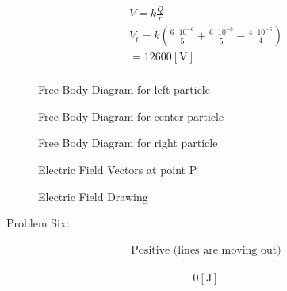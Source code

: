 \documentclass[12pt]{article}
\begin{document}
\begin{equation}
  \begin{split}
    V=k\frac{Q}{r}\\
    V_t=k\left( \frac{6\cdot10^{-6}}{5}+\frac{6\cdot10^{-6}}{5}-\frac{4\cdot10^{-6}}{4} \right)\\
    =12600[\si{\volt}]\\
  \end{split}
  \label{12}
\end{equation}


\hline

\newpage

    \begin{figure}[h]
      \centering
      
      \caption{Free Body Diagram for left particle}
      \label{fig:2}
    \end{figure}

    \begin{figure}[h]
      \centering
      
      \caption{Free Body Diagram for center particle}
      \label{fig:3}
    \end{figure}

    \begin{figure}[h]
      \centering
      
      \caption{Free Body Diagram for right particle}
      \label{fig:4}
    \end{figure}

    \begin{figure}[h]
      \centering
      
      \caption{Electric Field Vectors at point P}
      \label{fig:5}
    \end{figure}

    \begin{figure}[h]
      \centering
      
      \caption{Electric Field Drawing}
      \label{fig:6}
    \end{figure}
    
    \newpage

\begin{center}
  Problem Six:
\end{center}
\hline

\begin{equation}
  \begin{split}
    \text{Positive (lines are moving out)}
  \end{split}
  \label{13}
\end{equation}

\begin{equation}
  \begin{split}
    0[\si{\joule}]\\
  \end{split}
  \label{14}
\end{equation}
\end{document}
